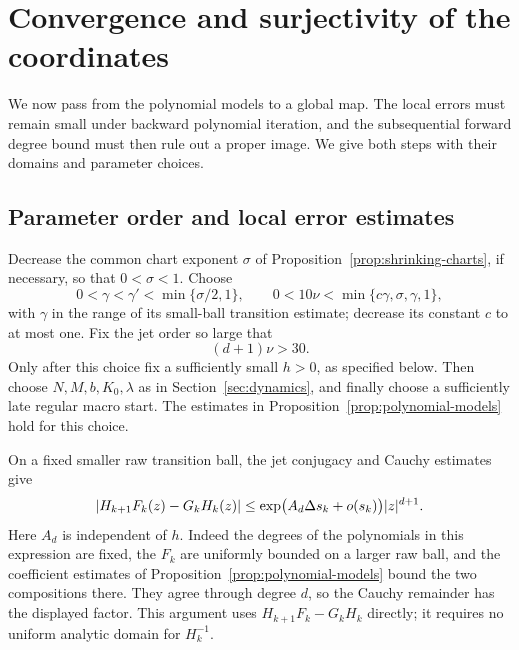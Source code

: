 \section{Convergence and surjectivity of the coordinates}
\label{sec:uniformization}

We now pass from the polynomial models to a global map.  The local
errors must remain small under backward polynomial iteration, and the
subsequential forward degree bound must then rule out a proper image.
We give both steps with their domains and parameter choices.

\subsection{Parameter order and local error estimates}

Decrease the common chart exponent $\sigma$ of
Proposition~\ref{prop:shrinking-charts}, if necessary, so that
$0<\sigma<1$.  Choose
\begin{equation}
 0<\gamma<\gamma'<\min\{\sigma/2,1\},
 \qquad 0<10\nu<\min\{c\gamma,\sigma,\gamma,1\},
 \label{eq:unif:decay-parameters}
\end{equation}
with $\gamma$ in the range of its small-ball transition estimate;
decrease its constant $c$ to at most one.  Fix the jet order so large
that
\begin{equation}
 (d+1)\nu>30.
 \label{eq:unif:jet-order}
\end{equation}
Only after this choice fix a sufficiently small $h>0$, as specified
below.  Then choose $N,M,b,K_0,\lambda$ as in
Section~\ref{sec:dynamics}, and finally choose a sufficiently late
regular macro start.  The estimates in
Proposition~\ref{prop:polynomial-models} hold for this choice.

On a fixed smaller raw transition ball, the jet conjugacy and Cauchy
estimates give
\begin{equation}
 \lvert H_{k+1}F_k(z)-G_kH_k(z)\rvert
 \le \exp\bigl(A_d\Delta s_k+o(s_k)\bigr)\lvert z\rvert^{d+1}.
 \label{eq:unif:remainder}
\end{equation}
Here $A_d$ is independent of $h$.  Indeed the degrees of the
polynomials in this expression are fixed, the $F_k$ are uniformly
bounded on a larger raw ball, and the coefficient estimates of
Proposition~\ref{prop:polynomial-models} bound the two compositions
there.  They agree through degree $d$, so the Cauchy remainder has
the displayed factor.  This argument uses $H_{k+1}F_k-G_kH_k$
directly; it requires no uniform analytic domain for $H_k^{-1}$.

